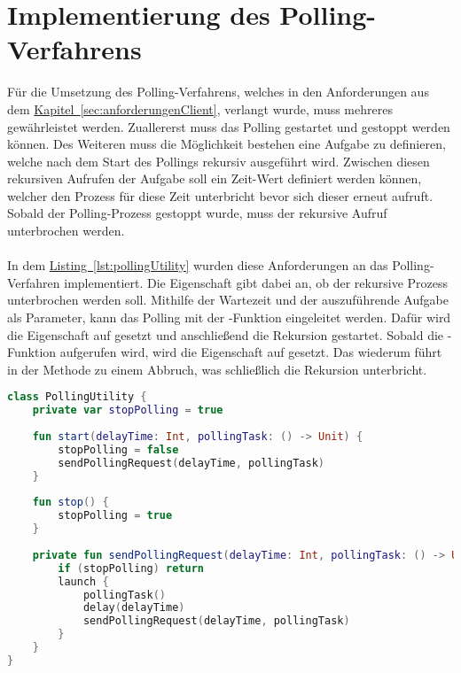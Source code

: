 \section{Implementierung des Polling-Verfahrens}\label{sec:polling}
Für die Umsetzung des Polling-Verfahrens, welches in den Anforderungen aus dem \hyperref[sec:anforderungenClient]{Kapitel~\ref{sec:anforderungenClient}}, verlangt wurde, muss mehreres gewährleistet werden. Zuallererst muss das Polling gestartet und gestoppt werden können. Des Weiteren muss die Möglichkeit bestehen eine Aufgabe zu definieren, welche nach dem Start des Pollings rekursiv ausgeführt wird. Zwischen diesen rekursiven Aufrufen der Aufgabe soll ein Zeit-Wert definiert werden können, welcher den Prozess für diese Zeit unterbricht bevor sich dieser erneut aufruft. Sobald der Polling-Prozess gestoppt wurde, muss der rekursive Aufruf unterbrochen werden.\\
\\
In dem \hyperref[lst:pollingUtility]{Listing~\ref{lst:pollingUtility}} wurden diese Anforderungen an das Polling-Verfahren implementiert. Die Eigenschaft  gibt dabei an, ob der rekursive Prozess unterbrochen werden soll. Mithilfe der Wartezeit und der auszuführende Aufgabe als Parameter, kann das Polling mit der -Funktion eingeleitet werden. Dafür wird die Eigenschaft  auf  gesetzt und anschließend die Rekursion gestartet. Sobald die -Funktion aufgerufen wird, wird die Eigenschaft  auf  gesetzt. Das wiederum führt in der Methode  zu einem Abbruch, was schließlich die Rekursion unterbricht.\\
\begin{lstlisting}[style=lstStyleFramed, language=Kotlin, caption={Implementierung der Klasse \code{PollingUtility} für die Umsetzung des Polling-Verfahrens}, label=lst:pollingUtility, float]
class PollingUtility {
	private var stopPolling = true
	
	fun start(delayTime: Int, pollingTask: () -> Unit) {
		stopPolling = false
		sendPollingRequest(delayTime, pollingTask)
	}
	
	fun stop() {
		stopPolling = true
	}
	
	private fun sendPollingRequest(delayTime: Int, pollingTask: () -> Unit) {
		if (stopPolling) return
		launch {
			pollingTask()
			delay(delayTime)
			sendPollingRequest(delayTime, pollingTask)
		}
	}
}
\end{lstlisting}
\\
